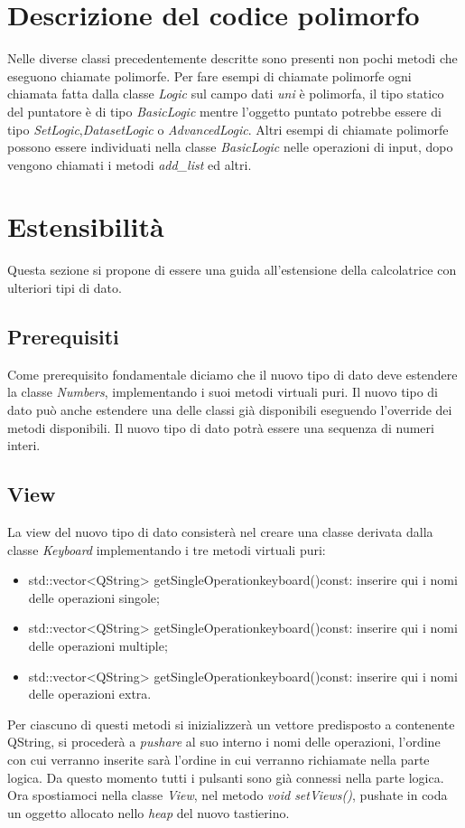 \documentclass[a4paper,10pt]{article}
\begin{document}
        \section{Descrizione del codice polimorfo}
        Nelle diverse classi precedentemente descritte sono presenti non pochi metodi che eseguono chiamate polimorfe.
        Per fare esempi di chiamate polimorfe ogni chiamata fatta dalla classe \textit{Logic} sul campo dati \textit{uni} è polimorfa, il tipo statico del puntatore è di tipo \textit{BasicLogic} mentre l'oggetto puntato potrebbe essere di tipo \textit{SetLogic},\textit{DatasetLogic} o \textit{AdvancedLogic}.
        Altri esempi di chiamate polimorfe possono essere individuati nella classe \textit{BasicLogic} nelle operazioni di input, dopo vengono chiamati i metodi \textit{add\_list} ed altri.

        \section{Estensibilità}
        Questa sezione si propone di essere una guida all'estensione della calcolatrice con ulteriori tipi di dato.
        \subsection{Prerequisiti}
        Come prerequisito fondamentale diciamo che il nuovo tipo di dato deve estendere la classe \textit{Numbers}, implementando i suoi metodi virtuali puri.
        Il nuovo tipo di dato può anche estendere una delle classi già disponibili eseguendo l'override dei metodi disponibili.
        Il nuovo tipo di dato potrà essere una sequenza di numeri interi.
        \subsection{View}
        La view del nuovo tipo di dato consisterà nel creare una classe derivata dalla classe \textit{Keyboard} implementando i tre metodi virtuali puri:
        \begin{itemize}
            \item std::vector<QString> getSingleOperationkeyboard()const: inserire qui i nomi delle operazioni singole;
            \item std::vector<QString> getSingleOperationkeyboard()const: inserire qui i nomi delle operazioni multiple;
            \item std::vector<QString> getSingleOperationkeyboard()const: inserire qui i nomi delle operazioni extra.
        \end{itemize}
        Per ciascuno di questi metodi si inizializzerà un vettore predisposto a contenente QString, si procederà a \textit{pushare} al suo interno i nomi delle operazioni, l'ordine con cui verranno inserite sarà l'ordine in cui verranno richiamate nella parte logica. Da questo momento tutti i pulsanti sono già connessi nella parte logica. \\
        Ora spostiamoci nella classe \textit{View}, nel metodo \textit{void setViews()}, pushate in coda un oggetto allocato nello \textit{heap} del nuovo tastierino.
\end{document}
